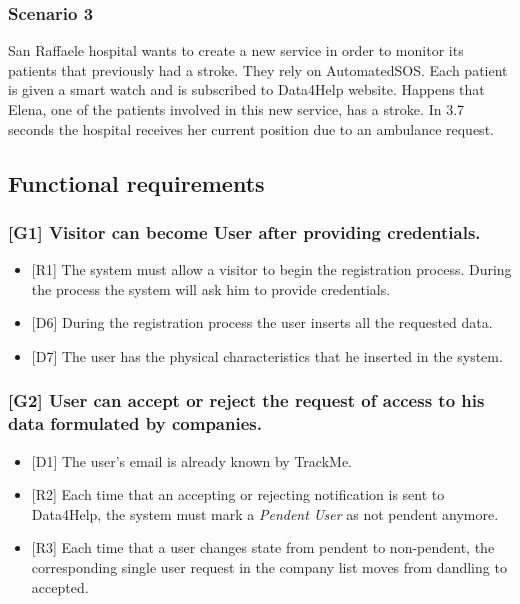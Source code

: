 \documentclass{article}
\begin{document}
\subsubsection{Scenario 3}
San Raffaele hospital wants to create a new service in order to monitor its patients that previously had a stroke. They rely on AutomatedSOS. Each patient is given a smart watch and is subscribed to Data4Help website. Happens that Elena, one of the patients involved in this new service, has a stroke. In 3.7 seconds the hospital receives her current position due to an ambulance request.
\subsection{Functional requirements}
\subsubsection{[G1] Visitor can become User after providing credentials.}
\begin{itemize}
\item {[R1]} The system must allow a visitor to begin the registration process. During the process the system will ask him to provide credentials.
\item {[D6]} During the registration process the user inserts all the requested data.
\item {[D7]} The user has the physical characteristics that he inserted in the system.
\end{itemize}
\subsubsection{[G2] User can accept or reject the request of access to his data formulated by companies.}
\begin{itemize}
\item {[D1]} The user's email is already known by TrackMe.
\item {[R2]} Each time that an accepting or rejecting notification is sent to Data4Help, the system must mark a \emph{Pendent User} as not pendent anymore.
\item {[R3]} Each time that a user changes state from pendent to non-pendent, the corresponding single user request in the company list moves from dandling to accepted.
\end{itemize}
\end{document}
